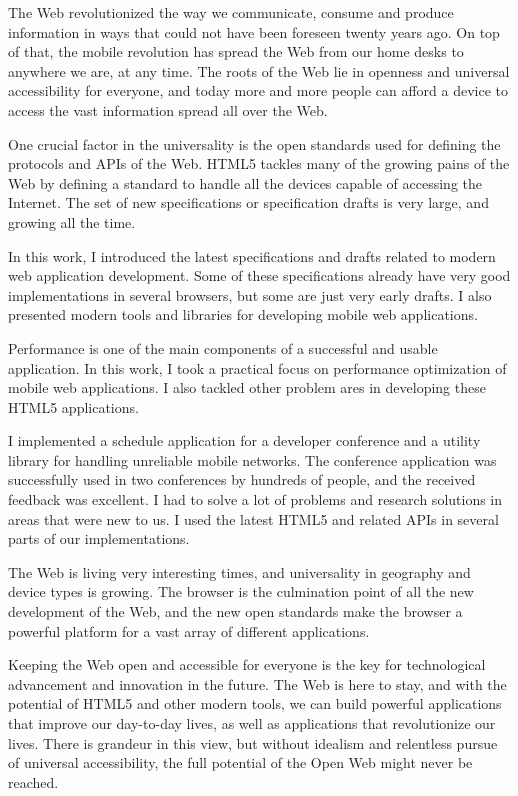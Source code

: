 The Web revolutionized the way we communicate, consume and produce
information in ways that could not have been foreseen twenty years
ago. On top of that, the mobile revolution has spread the Web from our
home desks to anywhere we are, at any time. The roots of the Web lie
in openness and universal accessibility for everyone, and today more
and more people can afford a device to access the vast information
spread all over the Web.

One crucial factor in the universality is the open standards used for
defining the protocols and APIs of the Web. HTML5 tackles many of the
growing pains of the Web by defining a standard to handle all the
devices capable of accessing the Internet. The set of new
specifications or specification drafts is very large, and growing all
the time.

In this work, I introduced the latest specifications and drafts
related to modern web application development. Some of these
specifications already have very good implementations in several
browsers, but some are just very early drafts. I also presented modern
tools and libraries for developing mobile web applications.

Performance is one of the main components of a successful and usable
application. In this work, I took a practical focus on performance
optimization of mobile web applications. I also tackled other problem
ares in developing these HTML5 applications.

I implemented a schedule application for a developer conference and a
utility library for handling unreliable mobile networks. The
conference application was successfully used in two conferences by
hundreds of people, and the received feedback was excellent. I had to
solve a lot of problems and research solutions in areas that were new
to us. I used the latest HTML5 and related APIs in several parts of
our implementations.

The Web is living very interesting times, and universality in
geography and device types is growing. The browser is the culmination
point of all the new development of the Web, and the new open
standards make the browser a powerful platform for a vast array of
different applications.

Keeping the Web open and accessible for everyone is the key for
technological advancement and innovation in the future. The Web is
here to stay, and with the potential of HTML5 and other modern tools,
we can build powerful applications that improve our day-to-day lives,
as well as applications that revolutionize our lives. There is
grandeur in this view, but without idealism and relentless pursue of
universal accessibility, the full potential of the Open Web might
never be reached.

